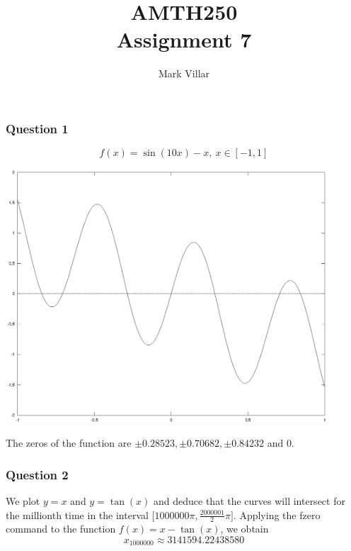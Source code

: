\documentclass[11pt,a4paper]{article}
\title{AMTH250 \\ Assignment 7}
\author{Mark Villar}
\begin{document}
\maketitle

\subsubsection*{Question 1} 
$$f(x)=\sin(10x)-x, \ x \in [-1,1]$$
\begin{center}
	\includegraphics[width=0.9\textwidth]{wave.eps}
\end{center}
The zeros of the function are $\pm0.28523, \pm0.70682, \pm0.84232$ and 0.

\subsubsection*{Question 2}
We plot $y=x$ and $y=\tan(x)$ and deduce that the curves will intersect for the millionth time in the interval $\big[1000000\pi,\frac{2000001}{2}\pi \big]$. Applying the fzero command to the function $f(x)=x-\tan(x)$, we obtain 
$$x_{1000000}\approx 3141594.22438580$$
\end{document}
